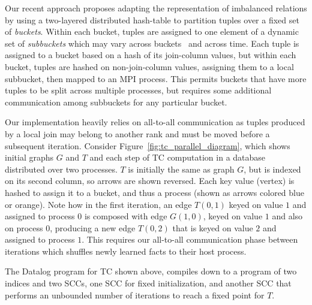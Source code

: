 Our recent approach proposes adapting the representation of imbalanced relations by using a two-layered distributed hash-table to partition tuples over a fixed set of \emph{buckets}. Within each bucket, tuples are assigned to one element of a dynamic set of \emph{subbuckets} which may vary across buckets~\cite{kumar:hipc:2019} and across time. Each tuple is assigned to a bucket based on a hash of its join-column values, but within each bucket, tuples are hashed on non-join-column values, assigning them to a local subbucket, then mapped to an MPI process. This permits buckets that have more tuples to be split across multiple processes, but requires some additional communication among subbuckets for any particular bucket. 

Our implementation heavily relies on all-to-all communication as tuples produced by a local join may belong to another rank and must be moved before a subsequent iteration. 
Consider Figure~\ref{fig:tc_parallel_diagram}, which shows initial graphs $G$ and $T$ and each step of TC computation in a database distributed over two processes. $T$ is initially the same as graph $G$, but is indexed on its second column, so arrows are shown reversed. Each key value (vertex) is hashed to assign it to a bucket, and thus a process (shown as arrows colored blue or orange). Note how in the first iteration, an edge $T(0,1)$ keyed on value $1$ and assigned to process $0$ is composed with edge $G(1,0)$, keyed on value $1$ and also on process $0$, producing a new edge $T(0,2)$ that is keyed on value $2$ and assigned to process $1$. This requires our all-to-all communication phase between iterations which shuffles newly learned facts to their host process. 

The Datalog program for TC shown above, compiles down to a program of two indices and two SCCs, one SCC for fixed initialization, and another SCC that performs an unbounded number of iterations to reach a fixed point for $T$. 


